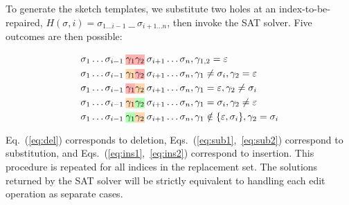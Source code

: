 \documentclass[sigplan,nonacm]{acmart}\settopmatter{printfolios=false,printccs=false,printacmref=false}
\begin{document}
  \begin{prooftree}
  \end{prooftree}

  \vspace{5pt}
  \noindent To generate the sketch templates, we substitute two holes at an index-to-be-repaired, $H(\sigma, i) = \sigma_{1\ldots i-1}\:\texttt{\_ \_}\:\sigma_{i+1\ldots n}$, then invoke the SAT solver. Five outcomes are then possible:

  \begin{align}
    &\sigma_{1}\ldots\sigma_{i-1}\:\text{\hlred{$\gamma_1$}\hlred{$\gamma_2$}}\:\sigma_{i+1}\ldots\sigma_{n}, \gamma_{1, 2} = \varepsilon\label{eq:del}\\
    &\sigma_{1}\ldots \sigma_{i-1}\:\text{\hlorange{$\gamma_1$}\hlred{$\gamma_2$}}\:\sigma_{i+1}\ldots \sigma_{n}, \gamma_1 \neq \sigma_i, \gamma_2 = \varepsilon\label{eq:sub1}\\
    &\sigma_{1}\ldots \sigma_{i-1}\:\text{\hlred{$\gamma_1$}\hlorange{$\gamma_2$}}\:\sigma_{i+1}\ldots \sigma_{n}, \gamma_1 = \varepsilon, \gamma_2 \neq \sigma_i\label{eq:sub2}\\
    &\sigma_{1}\ldots\sigma_{i-1}\: \text{\hlorange{$\gamma_1$}\hlgreen{$\gamma_2$}}\:\sigma_{i+1}\ldots\sigma_{n}, \gamma_1 = \sigma_i, \gamma_2 \neq \varepsilon\label{eq:ins1}\\
    &\sigma_{1}\ldots\sigma_{i-1}\: \text{\hlgreen{$\gamma_1$}\hlorange{$\gamma_2$}}\:\sigma_{i+1}\ldots\sigma_{n}, \gamma_1 \notin \{\varepsilon, \sigma_i\}, \gamma_2 = \sigma_i\label{eq:ins2}
  \end{align}

  \noindent Eq.~(\ref{eq:del}) corresponds to deletion, Eqs.~(\ref{eq:sub1},~\ref{eq:sub2}) correspond to substitution, and Eqs.~(\ref{eq:ins1},~\ref{eq:ins2}) correspond to insertion. This procedure is repeated for all indices in the replacement set. The solutions returned by the SAT solver will be strictly equivalent to handling each edit operation as separate cases.

  
\end{document}
